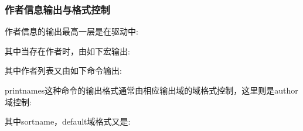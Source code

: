 \subsubsection{作者信息输出与格式控制}\label{sec:name:fmt:out}
作者信息的输出最高一层是在驱动中:
\begin{texlist}
\end{texlist}

其中当存在作者时，由如下宏输出:
\begin{texlist}
\end{texlist}

其中作者列表又由如下命令输出:
\begin{texlist}
\end{texlist}

printnames这种命令的输出格式通常由相应输出域的域格式控制，这里则是author域控制:
\begin{texlist}

\end{texlist}

其中sortname，default域格式又是:
\begin{texlist}

\end{texlist}


